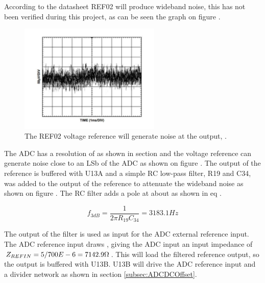 According to the datasheet REF02 will produce wideband noise, this has not been verified during this project, as can be seen the graph on figure  .
\begin{figure}[H]
    \centering
    \includegraphics[clip, trim=0 25 0 0, width=0.6\textwidth]{Sections/7_SystemDesign/Figures/7_1_3_REFNoise.pdf}
    \caption{The REF02 voltage reference will generate noise at the output, \cite{REF02}.}
    \label{fig_7_1_3_REFNOISE}
\end{figure}

The ADC has a resolution of  as shown in section  and the voltage reference can generate noise close to an LSb of the ADC as shown on figure . The output of the reference is buffered with U13A and a simple RC low-pass filter, R19 and C34, was added to the output of the reference to attenuate the wideband noise as shown on figure . The RC filter adds a pole at about  as shown in eq .

\begin{equation}\label{eq:7_1_3_5VREFSimplePole}
    f_{3dB} = \frac{1}{2\pi R_{19} C_{34}} = 3183.1 Hz
\end{equation}

The output of the filter is used as input for the ADC external reference input. The ADC reference input draws , giving the ADC input an input impedance of $Z_{REFIN} = 5/700E-6 = 7142.9 \ohm$. This will load the filtered reference output, so the output is buffered with U13B. U13B will drive the ADC reference input and a divider network as shown in section \ref{subsec:ADCDCOffset}.

